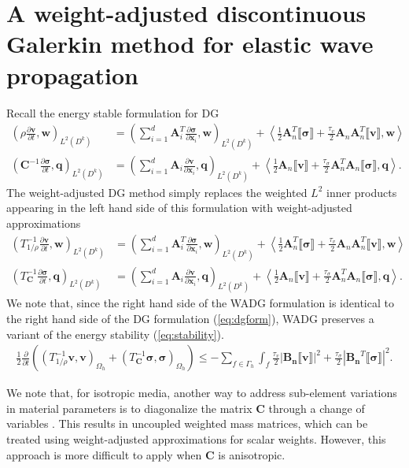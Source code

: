 \documentclass{siamart0216}
\newcommand{\pd}[2]{\frac{\partial#1}{\partial#2}}
\newcommand{\LRp}[1]{\left( #1 \right)}
\newcommand{\LRa}[1]{\left\langle #1 \right\rangle}
\newcommand{\LRb}[1]{\left| #1 \right|}
\newcommand{\jump}[1] {\ensuremath{\llbracket#1\rrbracket}}
\newcommand{\Lk}{L^2\LRp{D^k}}
\begin{document}
\section{A weight-adjusted discontinuous Galerkin method for elastic wave propagation}

Recall the energy stable formulation for DG 
\begin{align*}
\LRp{\rho \pd{\bm{v}}{t},\bm{w}}_{\Lk} &= \LRp{ \sum_{i=1}^d \bm{A}_i^T\pd{\bm{\sigma}}{\bm{x}_i},\bm{w}}_{\Lk}  + \LRa{\frac{1}{2}\bm{A}_n^T\jump{\bm{\sigma}} + \frac{\tau_v}{2}\bm{A}_n\bm{A}_n^T\jump{\bm{v}},\bm{w}}\\
\LRp{\bm{C}^{-1} \pd{\bm{\sigma}}{t},\bm{q}}_{\Lk} &= \LRp{\sum_{i=1}^d \bm{A}_i \pd{\bm{v}}{\bm{x}_i},\bm{q}}_{\Lk} + \LRa{\frac{1}{2}\bm{A}_n\jump{\bm{v}} + \frac{\tau_{\sigma}}{2}\bm{A}_n^T\bm{A}_n\jump{\bm{\sigma}},\bm{q}}.
\end{align*}
The weight-adjusted DG method simply replaces the weighted $L^2$ inner products appearing in the left hand side of this formulation with weight-adjusted approximations
\begin{align*}
\LRp{T^{-1}_{1/\rho} \pd{\bm{v}}{t},\bm{w}}_{\Lk} &= \LRp{ \sum_{i=1}^d \bm{A}_i^T\pd{\bm{\sigma}}{\bm{x}_i},\bm{w}}_{\Lk}  + \LRa{\frac{1}{2}\bm{A}_n^T\jump{\bm{\sigma}} + \frac{\tau_v}{2}\bm{A}_n\bm{A}_n^T\jump{\bm{v}},\bm{w}}\\
\LRp{T^{-1}_{\bm{C}} \pd{\bm{\sigma}}{t},\bm{q}}_{\Lk} &= \LRp{\sum_{i=1}^d \bm{A}_i \pd{\bm{v}}{\bm{x}_i},\bm{q}}_{\Lk} + \LRa{\frac{1}{2}\bm{A}_n\jump{\bm{v}} + \frac{\tau_{\sigma}}{2}\bm{A}_n^T\bm{A}_n\jump{\bm{\sigma}},\bm{q}}.
\end{align*}
We note that, since the right hand side of the WADG formulation is identical to the right hand side of the DG formulation (\ref{eq:dgform}), WADG preserves a variant of the energy stability (\ref{eq:stability}).  
\begin{align*}
\frac{1}{2}\pd{}{t}\LRp{\LRp{T^{-1}_{1/\rho} \bm{v},\bm{v}}_{\Omega_h} + \LRp{T_{\bm{C}}^{-1} \bm{\sigma},\bm{\sigma}}_{\Omega_h}} \leq - \sum_{f \in \Gamma_h} \int_{f} \frac{\tau_v}{2}\LRb{\bm{B_n}\jump{\bm{v}}}^2 + \frac{\tau_\sigma}{2}\LRb{\bm{B_n}^T\jump{\bm{\sigma}}}^2.  
\end{align*}

We note that, for isotropic media, another way to address sub-element variations in material parameters is to diagonalize the matrix $\bm{C}$ through a change of variables \cite{etienne2010hp}.  This results in uncoupled weighted mass matrices, which can be treated using weight-adjusted approximations for scalar weights.  However, this approach is more difficult to apply when $\bm{C}$ is anisotropic.  
\end{document}
